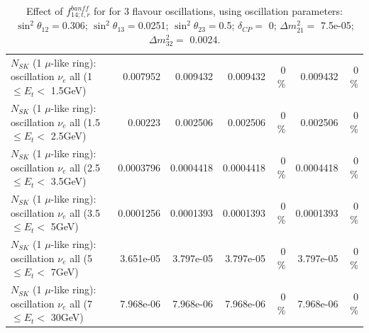 \begin{table}
\begin{tabular}{| l | r | r | r  r | r  r |}
$N_{SK}$ (1 $\mu$-like ring): oscillation $\nu_{e}$ all (1 $\leq E_{t} <$ 1.5GeV) &        0.007952 &        0.009432 &        0.009432 &        0 \%  &        0.009432 &        0 \%  \\ 
$N_{SK}$ (1 $\mu$-like ring): oscillation $\nu_{e}$ all (1.5 $\leq E_{t} <$ 2.5GeV) &         0.00223 &        0.002506 &        0.002506 &        0 \%  &        0.002506 &        0 \%  \\ 
$N_{SK}$ (1 $\mu$-like ring): oscillation $\nu_{e}$ all (2.5 $\leq E_{t} <$ 3.5GeV) &       0.0003796 &       0.0004418 &       0.0004418 &        0 \%  &       0.0004418 &        0 \%  \\ 
$N_{SK}$ (1 $\mu$-like ring): oscillation $\nu_{e}$ all (3.5 $\leq E_{t} <$ 5GeV) &       0.0001256 &       0.0001393 &       0.0001393 &        0 \%  &       0.0001393 &        0 \%  \\ 
 $N_{SK}$ (1 $\mu$-like ring): oscillation $\nu_{e}$ all (5 $\leq E_{t} <$ 7GeV) &       3.651e-05 &       3.797e-05 &       3.797e-05 &        0 \%  &       3.797e-05 &        0 \%  \\ 
$N_{SK}$ (1 $\mu$-like ring): oscillation $\nu_{e}$ all (7 $\leq E_{t} <$ 30GeV) &       7.968e-06 &       7.968e-06 &       7.968e-06 &        0 \%  &       7.968e-06 &        0 \%  \\ 
\hline
\hline
\end{tabular}
\caption{ Effect of $f_{14; t, r}^{banff}$ for for 3 flavour oscillations, using oscillation parameters:  $\sin^2\theta_{12} = $0.306; $\sin^2\theta_{13} = $0.0251; $\sin^2\theta_{23} = $0.5; $\delta_{CP} = $        0; $\Delta m^2_{21} = $    7.5e-05; $\Delta m^2_{32} = $    0.0024. }
\label{tab:num_banff_14_1RmuT_3f_osc_t13:0.0251}
\end{table}
\clearpage
